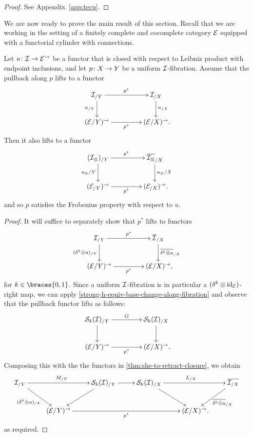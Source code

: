 \documentclass[reqno,10pt,a4paper,oneside,draft]{amsart}
\begin{document}
\begin{proof} See Appendix~\ref{app:tecp}.
\end{proof}

We are now ready to prove the main result of this section.
Recall that we are working in the setting of a finitely complete and cocomplete category $\cal{E}$ equipped with a functorial cylinder with connections.

\begin{theorem} \label{thm:frobenius-fibrations}
Let $u \co \cal{I} \to \catE^\to$ be a functor that is closed with respect to Leibniz product with endpoint inclusions, and let $p \co X \to Y$ be a uniform $\cal{I}$-fibration.
Assume that the pullback along $p$ lifts to a functor
\[
\xymatrix@C+2em{
  \cal{I}_{/Y}
  \ar[r]^{p^*}
  \ar[d]_{u_{/Y}}
&
  \cal{I}_{/X}
  \ar[d]^{u_{/X}}
\\
  (\catE / Y)^\to
  \ar[r]_{p^*}
&
  (\catE / X)^\to \rlap{.}
}
\]
Then it also lifts to a functor
\[
\xymatrix@C+2em{
  (\cal{I}_\otimes)_{/Y} \ar[r]^{p^*} \ar[d]_{u_{\otimes}/Y} & \overline{\cal{I}_\otimes}_{/X} \ar[d]^{u_{\otimes}/X} \\
  (\cal{E}_{/Y})^\to \ar[r]_{p^*} & (\cal{E}_{/X})^\to \rlap{.}
}
\]
and so $p$ satisfies the Frobenius property with respect to $u$.
\end{theorem}

\begin{proof}
It will suffice to separately show that $p^*$ lifts to functors
\[
\xymatrix@C+2em{
  \cal{I}_{/Y}
  \ar[r]^{p^*}
  \ar[d]_{(\kcyl \hatotimes u)_{/Y}}
&
  \overline{\cal{I}}_{/X}
  \ar[d]^{ \overline{\kcyl \hatotimes u}_{/X}}
\\
  (\catE / Y)^\to
  \ar[r]_{p^*}
&
  (\catE / X)^\to \rlap{,}
}
\]
for $k \in \braces{0, 1}$.
Since a uniform $\cal{I}$-fibration is in particular a $(\kcyl \otimes \id_\catE)$-right map, we can apply \cref{strong-h-equiv-base-change-along-fibration} and observe that the pullback functor lifts as follows:
\[
\xymatrix@C+2em{
  \cal{S}_k(\cal{I})_{/Y}
  \ar[r]^{G}
  \ar[d]
&
  \cal{S}_k(\cal{I})_{/X}
  \ar[d] \\
  (\catE / Y)^\to
  \ar[r]_{p^*}
&
  (\catE / X)^\to \rlap{.}
}
\]
Composing this with the the functors in \cref{thm:she-to-retract-closure}, we obtain
\[
\xymatrix{
  \cal{I}_{/Y}
  \ar[rr]^{M_{/Y}}
  \ar[dr]_{(\kcyl \hatotimes u)_{/Y}} &
&
  \cal{S}_k(\cal{I})_{/Y}
  \ar[r]
  \ar[dl]
&
  \cal{S}_k(\cal{I})_{/X}
  \ar[rr]^{L_{/X}}
  \ar[dr]
& &
  \overline{\cal{I}_{/X}}
  \ar[dl]^{\overline{\kcyl \hatotimes u}_{/X}}
\\ &
  (\catE/Y)^\to
  \ar[rrr]_{p^*}
&&&
  (\catE/X)^\to \rlap{.}
}
\]
as required.
\end{proof}
\end{document}
